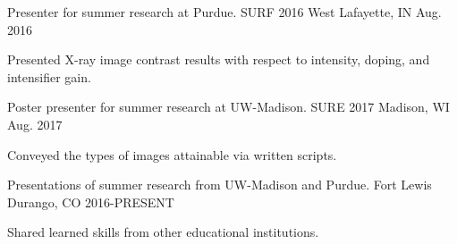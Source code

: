 \begin{cventries}
  \cventry
    {Presenter for summer research at Purdue.}
    {SURF 2016}
    {West Lafayette, IN}
    {Aug. 2016}
    {
      \begin{cvitems}
        \item {Presented X-ray image contrast results with respect to intensity, doping, and intensifier gain.}
      \end{cvitems}
    }
    
  \cventry
    {Poster presenter for summer research at UW-Madison.}
    {SURE 2017}
    {Madison, WI}
    {Aug. 2017}
    {
      \begin{cvitems}
        \item {Conveyed the types of images attainable via written scripts.}
      \end{cvitems}
    }
    
  \cventry
    {Presentations of summer research from UW-Madison and Purdue.}
    {Fort Lewis}
    {Durango, CO}
    {2016-PRESENT}
    {
      \begin{cvitems}
        \item {Shared learned skills from other educational institutions.}
      \end{cvitems}
    }
\end{cventries}
